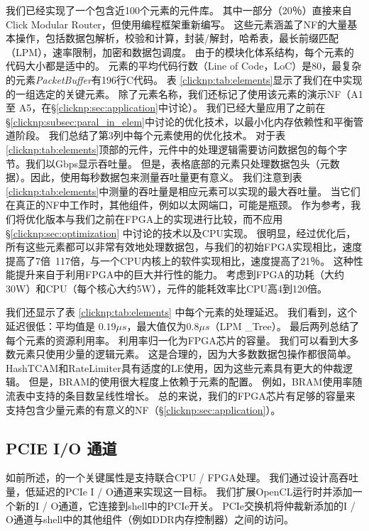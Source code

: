 我们已经实现了一个包含近100个元素的\name 元件库。
其中一部分（20％）直接来自Click Modular Router，但使用\name 编程框架重新编写。
这些元素涵盖了NF的大量基本操作，包括数据包解析，校验和计算，封装/解封，哈希表，最长前缀匹配（LPM），速率限制，加密和数据包调度。
由于\name 的模块化体系结构，每个元素的代码大小都是适中的。
元素的平均代码行数（Line of Code，LoC）是80，最复杂的元素\textit {PacketBuffer}有196行C代码。
表 \ref {clicknp:tab:elements}显示了我们在\name 中实现的一组选定的关键元素。
除了元素名称，我们还标记了使用该元素的演示NF（A1 至 A5，在\S \ref {clicknp:sec:application}中讨论）。
我们已经大量应用了之前在\S \ref {clicknp:subsec:paral_in_elem}中讨论的优化技术，以最小化内存依赖性和平衡管道阶段。
我们总结了第3列中每个元素使用的优化技术。
对于表 \ref {clicknp:tab:elements}顶部的元件，元件中的处理逻辑需要访问数据包的每个字节。我们以Gbps显示吞吐量。
但是，表格底部的元素只处理数据包头（元数据）。因此，使用每秒数据包来测量吞吐量更有意义。
我们注意到表 \ref {clicknp:tab:elements}中测量的吞吐量是相应元素可以实现的最大吞吐量。
当它们在真正的NF中工作时，其他组件，例如以太网端口，可能是瓶颈。
作为参考，我们将优化版本与我们之前在FPGA上的实现进行比较，而不应用\S \ref {clicknp:sec:optimization} 中讨论的技术以及CPU实现。
很明显，经过优化后，所有这些元素都可以非常有效地处理数据包，与我们的初始FPGA实现相比，速度提高了7倍~117倍，与一个CPU内核上的软件实现相比，速度提高了21％。
这种性能提升来自于利用FPGA中的巨大并行性的能力。
考虑到FPGA的功耗（大约30W）和CPU（每个核心大约5W），\name 元件的能耗效率比CPU高4到120倍。

我们还显示了表 \ref {clicknp:tab:elements} 中每个元素的处理延迟。
我们看到，这个延迟很低：平均值是 $0.19 \mu s$，最大值仅为$0.8 \mu s$（LPM \_Tree）。
最后两列总结了每个元素的资源利用率。 利用率归一化为FPGA芯片的容量。
我们可以看到大多数元素只使用少量的逻辑元素。
这是合理的，因为大多数数据包操作都很简单。
HashTCAM和RateLimiter具有适度的LE使用，因为这些元素具有更大的仲裁逻辑。
但是，BRAM的使用很大程度上依赖于元素的配置。 例如，BRAM使用率随流表中支持的条目数呈线性增长。
总的来说，我们的FPGA芯片有足够的容量来支持包含少量元素的有意义的NF（\S \ref{clicknp:sec:application}）。



\subsection{PCIE I/O 通道}
\label{clicknp:subsec:pcie}

如前所述，\name 的一个关键属性是支持联合CPU / FPGA处理。
我们通过设计高吞吐量，低延迟的PCIe I / O通道来实现这一目标。
我们扩展OpenCL运行时并添加一个新的I / O通道，它连接到shell中的PCIe开关。
PCIe交换机将仲裁新添加的I / O通道与shell中的其他组件（例如DDR内存控制器）之间的访问。

